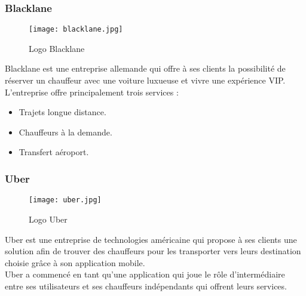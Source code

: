 \subsubsection{Blacklane}
\vspace{1cm}
\begin{figure}[H]
    \centering
    \texttt{[image: blacklane.jpg]}
    \vspace{0.5cm}
    \caption{Logo Blacklane}
    \label{fig:blacklane_logo}
\end{figure}
\vspace{1cm}
Blacklane \cite{blacklane} est une entreprise allemande qui offre à ses clients la possibilité de réserver un chauffeur avec une voiture luxueuse et vivre une expérience VIP.\\
\noindent L'entreprise offre principalement trois services :
\begin{itemize}
    \item Trajets longue distance.
    \item Chauffeurs à la demande.
    \item Transfert aéroport.
\end{itemize}
\subsubsection{Uber}
\vspace{1cm}
\begin{figure}[H]
    \centering
    \texttt{[image: uber.jpg]}
    \vspace{0.5cm}
    \caption{Logo Uber}
    \label{fig:uber_logo}
\end{figure}
\vspace{1cm}
Uber \cite{uber} est une entreprise de technologies américaine qui propose à ses clients une solution afin de trouver des chauffeurs pour les transporter vers leurs destination choisie grâce à son application mobile.\\
\noindent Uber a commencé en tant qu'une application qui joue le rôle d'intermédiaire entre ses utilisateurs et ses chauffeurs indépendants qui offrent leurs services.
